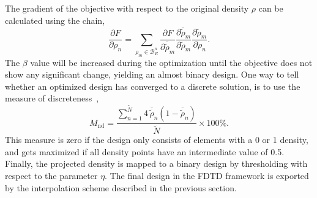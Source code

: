 \documentclass[aps,prl,twocolumn,superscriptaddress,longbibliography]{revtex4-1}
\begin{document}
The gradient of the objective with respect to the original density $\rho$ can be calculated using the chain,
\begin{equation}\label{GradientsFiltered}
\frac{\partial F}{\partial \rho_n}=\sum_{\rho_{m}\in \mathcal{B}^{n}_{R}} \frac{\partial F}{\partial \overline{\tilde{\rho}}_m} \frac{\partial \overline{\tilde{\rho}}_m}{\partial \widetilde{\rho}_m} \frac{\partial \tilde{\rho}_m}{\partial \rho_n}.
\end{equation}
The $\beta$ value will be increased during the optimization until the objective does not show any significant change, yielding an almost binary design. One way to tell whether an optimized design has converged to a discrete solution, is to use the measure of discreteness~\cite{Si07},
\begin{equation}\label{Eq:MeasureOfNon-discretness}
M_{\mathrm{n d}}=\frac{\sum_{n=1}^{\tilde{N}} 4 \,\overline{\tilde{\rho}}_n\left(1-\overline{\tilde{\rho}}_n\right)}{\tilde{N}} \times 100 \%.
\end{equation}
This measure is zero if the design only consists of elements with a 0 or 1 density, and gets maximized if all density points have an intermediate value of 0.5. 
Finally, the projected density is mapped to a binary design by thresholding with respect to the parameter $\eta$. The final design in the FDTD framework is exported by the interpolation scheme described in the previous section.\par
\end{document}
